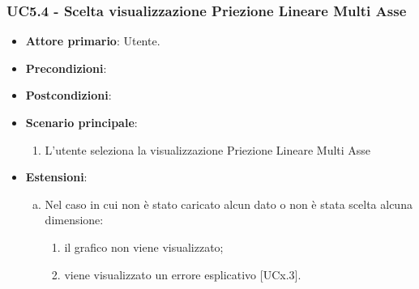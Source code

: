 \subsubsection{UC5.4 - Scelta visualizzazione Priezione Lineare Multi Asse}
\begin{figure}[h]
\centering
\caption{}
\end{figure}
\begin{itemize}
	\item \textbf{Attore primario}: Utente.
	\item \textbf{Precondizioni}:
	\item \textbf{Postcondizioni}:
	\item \textbf{Scenario principale}:
		\begin{enumerate}
			\item L'utente seleziona la visualizzazione Priezione Lineare Multi Asse
		\end{enumerate}
	\item \textbf{Estensioni}:
	\begin{enumerate}[(a)]
		\item Nel caso in cui non è stato caricato alcun dato o non è stata scelta alcuna dimensione:
		\begin{enumerate}[1.]
			\item il grafico non viene visualizzato;
			\item viene visualizzato un errore esplicativo [UCx.3].
		\end{enumerate}
	\end{enumerate}
\end{itemize}